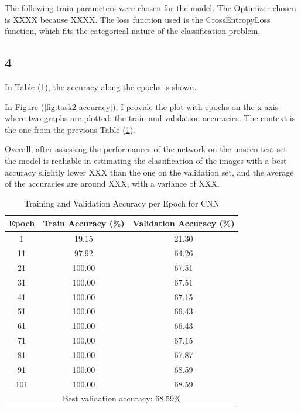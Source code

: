 \documentclass[11pt]{scrartcl}
\begin{document}
The following train parameters were chosen for the model.
The Optimizer chosen is XXXX because XXXX.
The loss function used is the CrossEntropyLoss function, 
which fits the categorical nature of the classification problem.


\subsection*{4}

In Table (\ref{tab:task2-accuracy}),
the accuracy along the epochs is shown.

In Figure (\ref{fig:task2-accuracy}), 
I provide the plot with epochs on the x-axis where two graphs are plotted:
the train and validation accuracies.
The context is the one from the previous Table (\ref{tab:task2-accuracy}). 

Overall, after assessing the performances of the network on the unseen test set
the model is realiable in estimating the classification of the images with
a best accuracy slightly lower XXX than the one on the validation set,
and the average of the accuracies are around XXX,
with a variance of XXX.

\begin{table}[htbp]
\centering
\caption{Training and Validation Accuracy per Epoch for CNN}
\begin{tabular}{ccc}
\toprule
\textbf{Epoch} & \textbf{Train Accuracy (\%)} & \textbf{Validation Accuracy (\%)} \\
\midrule
1    & 19.15 & 21.30 \\
11   & 97.92 & 64.26 \\
21   & 100.00 & 67.51 \\
31   & 100.00 & 67.51 \\
41   & 100.00 & 67.15 \\
51   & 100.00 & 66.43 \\
61   & 100.00 & 66.43 \\
71   & 100.00 & 67.15 \\
81   & 100.00 & 67.87 \\
91   & 100.00 & 68.59 \\
101  & 100.00 & 68.59 \\
\midrule
\multicolumn{3}{c}{Best validation accuracy: 68.59\%} \\
\bottomrule
\end{tabular}
\label{tab:task2-accuracy}
\end{table}
\end{document}
